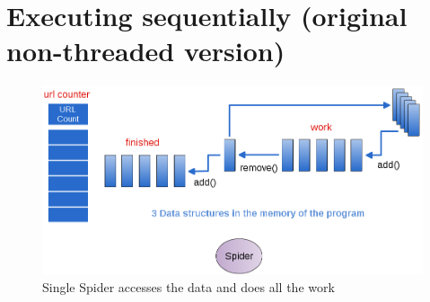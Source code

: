 \documentclass[letterpaper,10pt,openany,oneside]{sphinxmanual}
\begin{document}
\section{Executing sequentially (original non-threaded version)}
\label{URLSpider/URLSpider:executing-sequentially-original-non-threaded-version}\begin{figure}[htbp]
\centering
\capstart

\includegraphics{Spider11.png}
\caption{Single Spider accesses the data and does all the work}\end{figure}
\end{document}
